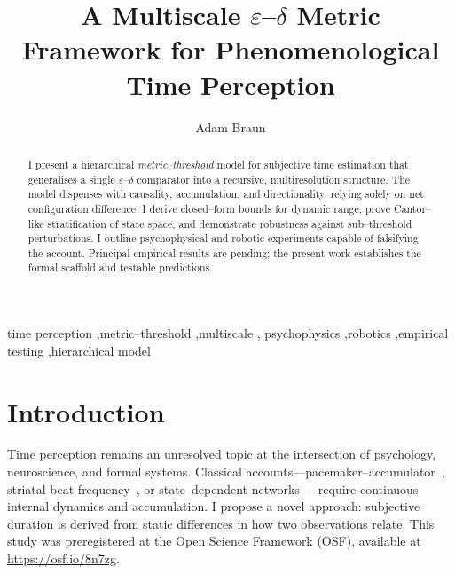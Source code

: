 \documentclass[preprint,11pt]{elsarticle}
\title{A Multiscale \texorpdfstring{$\varepsilon$--$\delta$}{epsilon--delta} Metric Framework for Phenomenological Time Perception}
\author[inst1]{Adam Braun}
\affiliation[inst1]{organization={Independent Researcher},
            city={Kiryat Malachi},
            country={Israel}}
\begin{document}
\begin{frontmatter}

\begin{abstract}
I present a hierarchical \emph{metric--threshold} model for subjective
time estimation that generalises a single $\varepsilon$--$\delta$
comparator into a recursive, multiresolution structure.  The model
dispenses with causality, accumulation, and directionality, relying
solely on net configuration difference.  I derive closed--form bounds
for dynamic range, prove Cantor--like stratification of state space,
and demonstrate robustness against sub--threshold perturbations.
I outline psychophysical and robotic experiments capable of falsifying
the account.  Principal empirical results are pending; the present work
establishes the formal scaffold and testable predictions.

\end{abstract}

\begin{keyword}
time perception \sep metric--threshold \sep multiscale \sep
psychophysics \sep robotics \sep empirical testing \sep hierarchical model
\end{keyword}

\end{frontmatter}

\section{Introduction}
Time perception remains an unresolved topic at the intersection of
psychology, neuroscience, and formal systems.  Classical
accounts---pacemaker--accumulator~\citep{gibbonscalar},
striatal beat frequency~\citep{miallbeat}, or state--dependent
networks~\citep{buonomano2009}---require continuous internal dynamics
and accumulation.  I propose a novel approach: subjective duration is
derived from static differences in how two observations relate.
This study was preregistered at the Open Science Framework (OSF), available at \url{https://osf.io/8n7zg}.
\end{document}
